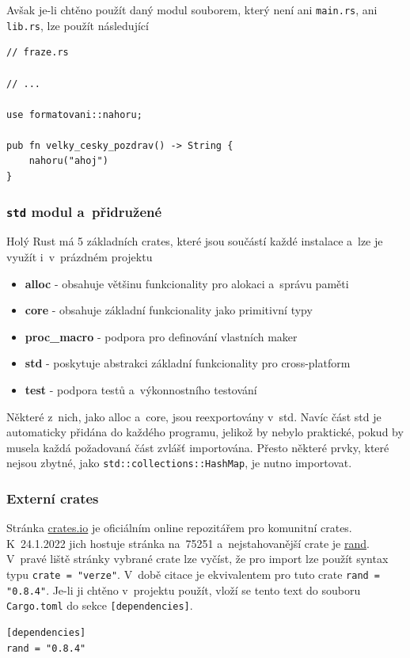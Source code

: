 \documentclass[a4paper, 12pt]{article} %
\newcommand{\rust}[1]{\texttt{#1}}
\begin{document}
		Avšak je-li chtěno použít daný modul souborem, který není ani \texttt{main.rs}, ani \texttt{lib.rs}, lze použít následující
		\begin{verbatim}
// fraze.rs

// ...

use formatovani::nahoru;

pub fn velky_cesky_pozdrav() -> String {
	nahoru("ahoj")
}
		\end{verbatim}
		
		
		\subsubsection*{\rust{std} modul a~přidružené}
			Holý Rust má 5 základních crates, které jsou součástí každé instalace a~lze je využít i~v~prázdném projektu
			\begin{itemize}
				\item \textbf{alloc} - obsahuje většinu funkcionality pro alokaci a~správu paměti
				\item \textbf{core} - obsahuje základní funkcionality jako primitivní typy
				\item \textbf{proc\_macro} - podpora pro definování vlastních maker
				\item \textbf{std} - poskytuje abstrakci základní funkcionality pro cross-platform
				\item \textbf{test} - podpora testů a~výkonnostního testování
			\end{itemize}

			Některé z~nich, jako alloc a~core, jsou reexportovány v~std. Navíc část std je automaticky přidána do každého programu, jelikož by nebylo praktické, pokud by musela každá požadovaná část zvlášť importována. Přesto některé prvky, které nejsou zbytné, jako \rust{std::collections::HashMap}, je nutno importovat.

		\subsubsection*{Externí crates}
			Stránka \href{https://crates.io/}{crates.io} je oficiálním online repozitářem pro komunitní crates. K~24.1.2022 jich hostuje stránka na~75251 a~nejstahovanější crate je \href{https://crates.io/crates/rand}{rand}. V~pravé liště stránky vybrané crate lze vyčíst, že pro import lze použít syntax typu \texttt{crate = "verze"}. V~době citace je ekvivalentem pro tuto crate \texttt{rand = "0.8.4"}. Je-li ji chtěno v~projektu použít, vloží se tento text do souboru \texttt{Cargo.toml} do sekce \texttt{[dependencies]}.
			\begin{verbatim}
[dependencies]
rand = "0.8.4"
			\end{verbatim}
		
\end{document}
